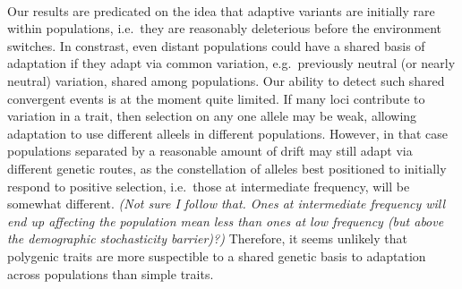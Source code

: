 \documentclass{article}
\newcommand{\plr}[1]{{\it\color{blue}(#1)}}
\begin{document}
\paragraph{}
Our results are predicated on the idea that adaptive variants are
initially rare within populations, i.e.\ they are reasonably
deleterious before the environment switches. In constrast, even distant populations could have
a shared basis of adaptation if they adapt via common variation,
e.g.\ previously neutral (or nearly neutral) variation, shared among populations. 
Our ability to detect such shared convergent events is at the moment quite limited. 
If many loci contribute to variation in a trait, then
selection on any one allele may be weak, allowing adaptation to use different alleels in different populations.
However, in that case populations separated by a reasonable amount of drift may still
adapt via different genetic routes, as the constellation of alleles
best positioned to initially respond to positive selection, 
i.e.\ those at intermediate frequency, will be somewhat different. 
\plr{Not sure I follow that.  Ones at intermediate frequency will end up affecting the population mean less
than ones at low frequency (but above the demographic stochasticity barrier)?}
Therefore, it seems unlikely that polygenic traits are more suspectible to a shared
genetic basis to adaptation across populations than simple traits.   

\end{document}
